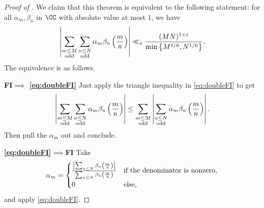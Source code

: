 \documentclass{lecturenotes}
\numberwithin{equation}{section}
\begin{document}
\begin{proof}[Proof of ]
    We claim that this theorem is equivalent to the following statement:  for all $\alpha_m,\beta_n$ in $\CC$ with absolute value at most $1$, we have
    \begin{equation}\label{eq:doubleFI}\left|{\sum_{\substack{m\leq M\\\textnormal{odd}}}\sum_{\substack{n\leq N\\\textnormal{odd}}}\alpha_m\beta_n\left(\frac{m}{n}\right)}\right|\ll_\varepsilon \frac{(MN)^{1+\varepsilon}}{\min\left\{{M^{1/6}, N^{1/6}}\right\}}.\end{equation}
    The equivalence is as follows.

    \textbf{FI$\implies$ \eqref{eq:doubleFI}} Just apply the triangle inequality in \eqref{eq:doubleFI} to get
    \[\left|{\sum_{\substack{m\leq M\\\textnormal{odd}}}\sum_{\substack{n\leq N\\\textnormal{odd}}}\alpha_m\beta_n\left(\frac{m}{n}\right)}\right|\leq \sum_{\substack{m\leq M\\\textnormal{odd}}}
    \left|{\sum_{\substack{n\leq N\\\textnormal{odd}}}\alpha_m\beta_n\left(\frac{m}{n}\right)}\right|.\]
    Then pull the $\alpha_m$ out and conclude.

    \textbf{\eqref{eq:doubleFI}$\implies$FI}
    Take 
    \[\alpha_m=\begin{cases}
        \frac{\left|{\sum_{n\leq N}\beta_n\left(\frac{m}{n}\right)}\right|}{\sum_{n\leq N}\beta_n\left(\frac{m}{n}\right)}&\textnormal{if the denominator is nonzero,}\\
        0&\textnormal{else,}
    \end{cases}\]
    and apply \eqref{eq:doubleFI}.


\end{proof}
\end{document}
